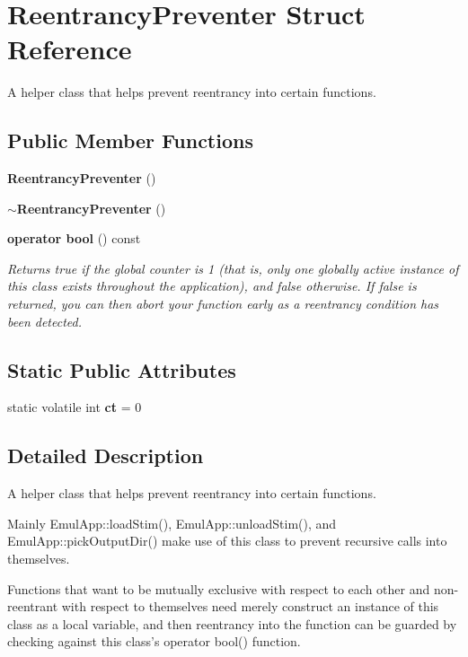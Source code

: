 \section{ReentrancyPreventer Struct Reference}
\label{structReentrancyPreventer}
A helper class that helps prevent reentrancy into certain functions.  


\subsection*{Public Member Functions}
\begin{CompactItemize}
\item 
{\bf ReentrancyPreventer} ()
\item 
{\bf $\sim$ReentrancyPreventer} ()
\item 
{\bf operator bool} () const \label{structReentrancyPreventer_2f9b7344c32f4096b5f73211fb5d3938}

\begin{CompactList}\small\item\em Returns true if the global counter is 1 (that is, only one globally active instance of this class exists throughout the application), and false otherwise. If false is returned, you can then abort your function early as a reentrancy condition has been detected. \item\end{CompactList}\end{CompactItemize}
\subsection*{Static Public Attributes}
\begin{CompactItemize}
\item 
static volatile int \textbf{ct} = 0\label{structReentrancyPreventer_b81c1eb29d2181821f7aec842c065303}

\end{CompactItemize}


\subsection{Detailed Description}
A helper class that helps prevent reentrancy into certain functions. 

Mainly EmulApp::loadStim(), EmulApp::unloadStim(), and EmulApp::pickOutputDir() make use of this class to prevent recursive calls into themselves.

Functions that want to be mutually exclusive with respect to each other and non-reentrant with respect to themselves need merely construct an instance of this class as a local variable, and then reentrancy into the function can be guarded by checking against this class's operator bool() function. 

